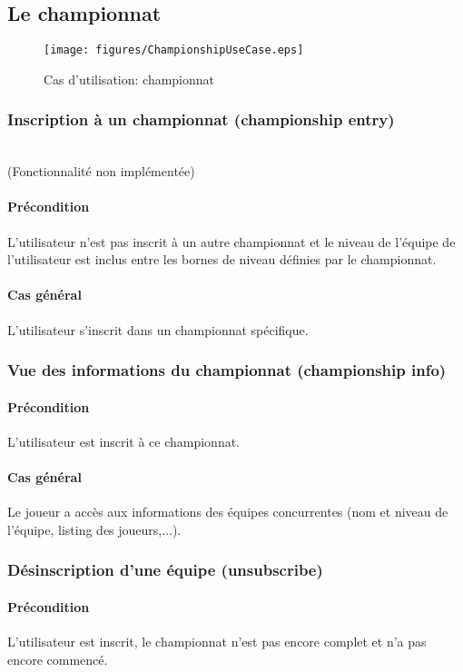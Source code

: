 \subsection{Le championnat}

\begin{figure}[h!]
  \centering
  \texttt{[image: figures/ChampionshipUseCase.eps]}
  \caption{\label{fig:UC:Championship} Cas d'utilisation: championnat}
\end{figure}

\subsubsection{Inscription à un championnat (championship entry)}
\\(Fonctionnalité non implémentée)
\paragraph{Précondition}
L'utilisateur n'est pas inscrit à un autre championnat et  le niveau de l'équipe de l'utilisateur est inclus entre les bornes de niveau définies par le championnat.
\paragraph{Cas général} L'utilisateur s'inscrit dans un championnat spécifique.

\subsubsection{Vue des informations du championnat (championship info)}
	\paragraph{Précondition} L'utilisateur est inscrit à ce championnat.
	\paragraph{Cas général} Le joueur a accès aux informations des équipes concurrentes 
		  (nom et niveau de l'équipe, listing des joueurs,...).

\subsubsection{Désinscription d'une équipe (unsubscribe)}
	\paragraph{Précondition} L'utilisateur est inscrit, le championnat n'est pas encore 
		  complet et n'a pas encore commencé.
